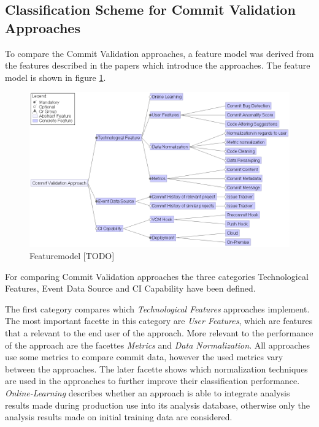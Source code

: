 \subsection{Classification Scheme for Commit Validation Approaches}
\label{sec:scheme}

To compare the Commit Validation approaches, a feature model was derived from the features described in the papers which introduce the approaches. The feature model is shown in figure \ref{fig:featuremodel}.

\begin{figure}[h]
	\centering
	\includegraphics[width=15cm]{images/featuremodel}
	\caption{Featuremodel [TODO]}
	\label{fig:featuremodel}
\end{figure}

For comparing Commit Validation approaches the three categories Technological Features, Event Data Source and CI Capability have been defined.

The first category compares which \textit{Technological Features} approaches implement. The most important facette in this category are \textit{User Features}, which are features that a relevant to the end user of the approach. 
More relevant to the performance of the approach are the facettes \textit{Metrics} and \textit{Data Normalization}. All approaches use some metrics to compare commit data, however the used metrics vary between the approaches.
The later facette shows which normalization techniques are used in the approaches to further improve their classification performance.
\textit{Online-Learning} describes whether an approach is able to integrate analysis results made during production use into its analysis database, otherwise only the analysis results made on initial training data are considered. 

